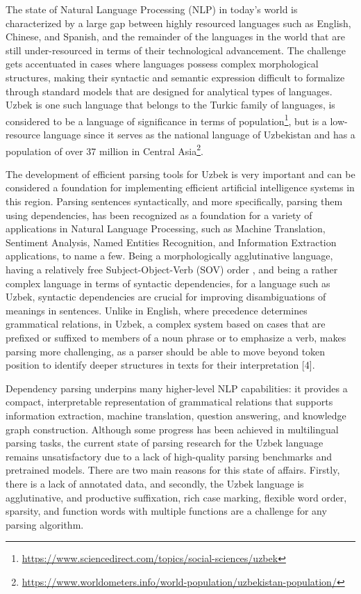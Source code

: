 \documentclass[runningheads]{llncs}
\begin{document}
The state of Natural Language Processing (NLP) in today's world is characterized by a large gap between highly resourced languages such as English, Chinese, and Spanish, and the remainder of the languages in the world that are still under-resourced in terms of their technological advancement\cite{blasi-etal-2022-systematic}. The challenge gets accentuated in cases where languages possess complex morphological structures, making their syntactic and semantic expression difficult to formalize through standard models that are designed for analytical types of languages. Uzbek is one such language that belongs to the Turkic family of languages, is considered to be a language of significance in terms of population\cite{KROUGLOV2017173}\footnote{\url{https://www.sciencedirect.com/topics/social-sciences/uzbek}}, but is a low-resource language since it serves as the national language of Uzbekistan and has a population of over 37 million in Central Asia\footnote{\url{https://www.worldometers.info/world-population/uzbekistan-population/}}.

The development of efficient parsing tools for Uzbek is very important and can be considered a foundation for implementing efficient artificial intelligence systems in this region. Parsing sentences syntactically, and more specifically, parsing them using dependencies, has been recognized as a foundation for a variety of applications in Natural Language Processing, such as Machine Translation, Sentiment Analysis, Named Entities Recognition, and Information Extraction applications, to name a few. Being a morphologically agglutinative language, having a relatively free Subject-Object-Verb (SOV) order\cite{nilufar-abdurakhmon} \cite{linguistic-feat}, and being a rather complex language in terms of syntactic dependencies, for a language such as Uzbek, syntactic dependencies\cite{11206779} are crucial for improving disambiguations of meanings in sentences. Unlike in English, where precedence determines grammatical relations, in Uzbek, a complex system based on cases that are prefixed or suffixed to members of a noun phrase or to emphasize a verb, makes parsing more challenging, as a parser should be able to move beyond token position to identify deeper structures in texts for their interpretation [4].

Dependency parsing underpins many higher-level NLP capabilities: it provides a compact, interpretable representation of grammatical relations that supports information extraction, machine translation, question answering, and knowledge graph construction. Although some progress has been achieved in multilingual parsing tasks, the current state of parsing research for the Uzbek language remains unsatisfactory due to a lack of high-quality parsing benchmarks and pretrained models. There are two main reasons for this state of affairs. Firstly, there is a lack of annotated data, and secondly, the Uzbek language is agglutinative, and productive suffixation, rich case marking, flexible word order, sparsity, and function words with multiple functions are a challenge for any parsing algorithm.
\end{document}
